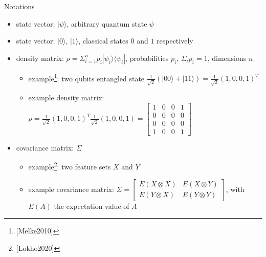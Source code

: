 \begin{frame}[title-small={color=hpiorange, bg=none, text=Context}]
	\maketitle
\end{frame}


\begin{frame}{Notations}
  \begin{minipage}{1.0\textwidth}
    \begin{itemize}
      \item state vector: $|\psi\rangle$, arbitrary quantum state $\psi$
      \item state vector: $|0\rangle$, $|1\rangle$, classical states $0$ and $1$ respectively
      \item density matrix: $\rho = \Sigma_{i=1}^{n} p_i |\psi_i\rangle \langle\psi_i |$, probabilities $p_i$, $\Sigma_{i} p_i = 1$, dimensions $n$
      \begin{itemize}
        \item example\footnote{[Melke2010]}: two qubits entangled state $\frac{1}{\sqrt{2}} ( |00\rangle + |11\rangle ) = \frac{1}{\sqrt{2}} (1, 0, 0, 1)^T $
        \item example density matrix: $\rho = \frac{1}{\sqrt{2}} (1, 0, 0, 1)^T \frac{1}{\sqrt{2}} (1, 0, 0, 1) = \begin{bmatrix} 1 & 0 & 0 & 1 \\ 0 & 0 & 0 & 0 \\ 0 & 0 & 0 & 0 \\ 1 & 0 & 0 & 1\end{bmatrix}$
      \end{itemize}
      \item covariance matrix: $\Sigma$
      \begin{itemize}
        \item example\footnote{[Lokho2020]}: two feature sets $X$ and $Y$
        \item example covariance matrix: $\Sigma = \begin{bmatrix} E(X \otimes X) & E(X \otimes Y) \\ E(Y \otimes X) & E(Y \otimes Y)\end{bmatrix}$, with $E(A)$ the expectation value of $A$
      \end{itemize}
    \end{itemize}
  \end{minipage}
\end{frame}


